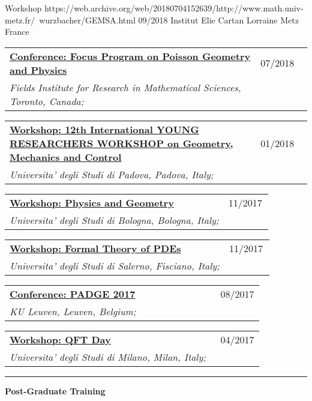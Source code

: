 \documentclass[a4paper]{article}
\newcommand{\block}[1]{\hrule \vspace{0.2cm} \textbf{\Large #1} \vspace{0.2cm}}
\newcommand{\longvoice}[8]{
	\begin{tabular}{p{0.83\linewidth} p{0.17\linewidth} }
		\textbf{\href{#3}{#2: #1}} & #4 
		\\ 
		\textit{#5, #6, #7;} & {\small\emph{#8}}
	\end{tabular}
	\vspace{.5em}
}
\begin{document}
		{Workshop}
		{https://web.archive.org/web/20180704152639/http://www.math.univ-metz.fr/~wurzbacher/GEMSA.html}
		{09/2018}
		{Institut Elie Cartan Lorraine}
		{Metz}
		{France}
		{}
	\longvoice{Focus Program on Poisson Geometry and Physics}
		{Conference}
		{https://web.archive.org/web/20190831105328/http://www.fields.utoronto.ca/activities/18-19/poisson-2018}
		{07/2018}
		{Fields Institute for Research in Mathematical Sciences}
		{Toronto}
		{Canada}
		{}
	\longvoice{12th International YOUNG RESEARCHERS WORKSHOP on Geometry, Mechanics and Control}
		{Workshop}
		{http://events.math.unipd.it/12YRW/}
		{01/2018}
		{Universita' degli Studi di Padova}
		{Padova}
		{Italy}
		{}
	\longvoice{Physics and Geometry}
		{Workshop}
		{https://agenda.infn.it/conferenceDisplay.py?confId=14261}
		{11/2017}
		{Universita' degli Studi di Bologna}
		{Bologna}
		{Italy}
		{}
	\longvoice{Formal Theory of PDEs}
		{Workshop}
		{http://www.dipmat2.unisa.it/people/vitagliano/www/micro-workshop.html}
		{11/2017}
		{Universita' degli Studi di Salerno}
		{Fisciano}
		{Italy}
		{}
	\longvoice{PADGE 2017}
		{Conference}
		{https://web.archive.org/web/20170924130155/https://wis.kuleuven.be/events/padge2017}
		{08/2017}
		{KU Leuven}
		{Leuven}
		{Belgium}
		{}
	\longvoice{QFT Day}
		{Workshop}
		{https://web.archive.org/web/20170924130005/http://www.matematica.unimi.it/extfiles/unimidire/66001/attachment/qft-day-2017-1.pdf}
		{04/2017}
		{Universita' degli Studi di Milano}
		{Milan}
		{Italy}
		{}


	\block{Post-Graduate Training}
\end{document}
